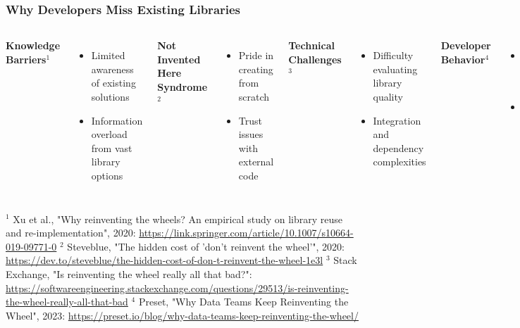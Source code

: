 \documentclass{beamer}
\begin{document}
\begin{frame}
\frametitle{Why Developers Miss Existing Libraries}

\begin{columns}[T]
\textbf{Knowledge Barriers}$^{1}$
\begin{itemize}
\item Limited awareness of existing solutions
\item Information overload from vast library options
\end{itemize}

\textbf{Not Invented Here Syndrome}$^{2}$
\begin{itemize}
\item Pride in creating from scratch
\item Trust issues with external code
\end{itemize}

\textbf{Technical Challenges}$^{3}$
\begin{itemize}
\item Difficulty evaluating library quality
\item Integration and dependency complexities
\end{itemize}

\textbf{Developer Behavior}$^{4}$
\begin{itemize}
\item Preference for familiar approaches
\item Desire for learning by implementing
\end{itemize}
\end{columns}

\vspace{0.3cm}
{\tiny
$^{1}$ Xu et al., "Why reinventing the wheels? An empirical study on library reuse and re-implementation", 2020: \url{https://link.springer.com/article/10.1007/s10664-019-09771-0}
$^{2}$ Steveblue, "The hidden cost of 'don't reinvent the wheel'", 2020: \url{https://dev.to/steveblue/the-hidden-cost-of-don-t-reinvent-the-wheel-1e3l}
$^{3}$ Stack Exchange, "Is reinventing the wheel really all that bad?": \url{https://softwareengineering.stackexchange.com/questions/29513/is-reinventing-the-wheel-really-all-that-bad}
$^{4}$ Preset, "Why Data Teams Keep Reinventing the Wheel", 2023: \url{https://preset.io/blog/why-data-teams-keep-reinventing-the-wheel/}
}
\end{frame}
\end{document}
